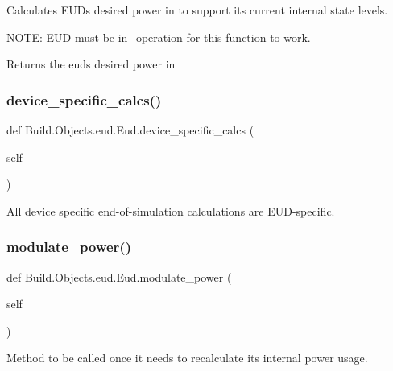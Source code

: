 Calculates E\+UD\textquotesingle{}s desired power in to support its current internal state levels. 

N\+O\+TE\+: E\+UD must be in\+\_\+operation for this function to work. \begin{DoxyReturn}{Returns}
the eud\textquotesingle{}s desired power in 
\end{DoxyReturn}
\mbox{\label{class_build_1_1_objects_1_1eud_1_1_eud_a4d6c3c842206a1738efd24319ddc2176}} 
\subsubsection{\texorpdfstring{device\+\_\+specific\+\_\+calcs()}{device\_specific\_calcs()}}
{\footnotesize\ttfamily def Build.\+Objects.\+eud.\+Eud.\+device\+\_\+specific\+\_\+calcs (\begin{DoxyParamCaption}\item[{}]{self }\end{DoxyParamCaption})}



All device specific end-\/of-\/simulation calculations are E\+U\+D-\/specific. 

\mbox{\label{class_build_1_1_objects_1_1eud_1_1_eud_a11d57b7f91d22bd696f2b29a8ac93044}} 
\subsubsection{\texorpdfstring{modulate\+\_\+power()}{modulate\_power()}}
{\footnotesize\ttfamily def Build.\+Objects.\+eud.\+Eud.\+modulate\+\_\+power (\begin{DoxyParamCaption}\item[{}]{self }\end{DoxyParamCaption})}



Method to be called once it needs to recalculate its internal power usage. 

